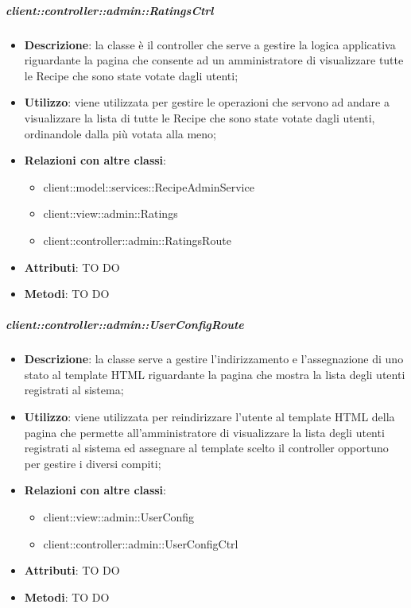 		\subparagraph{client::controller::admin::RatingsCtrl} %
		\label{subp:bdsm_app_client_controller_admin_ratingsctrl}
			\begin{itemize}
				\item \textbf{Descrizione}: la classe è il controller che serve a gestire la logica applicativa riguardante la pagina che consente ad un amministratore di visualizzare tutte le Recipe che sono state votate dagli utenti;
				\item \textbf{Utilizzo}: viene utilizzata per gestire le operazioni che servono ad andare a visualizzare la lista di tutte le Recipe che sono state votate dagli utenti, ordinandole dalla più votata alla meno;
				\item \textbf{Relazioni con altre classi}:
					\begin{itemize}
						\item client::model::services::RecipeAdminService
						\item client::view::admin::Ratings
						\item client::controller::admin::RatingsRoute
					\end{itemize}
				\item \textbf{Attributi}: TO DO
				\item \textbf{Metodi}: TO DO
			\end{itemize}

		\subparagraph{client::controller::admin::UserConfigRoute} %
		\label{subp:bdsm_app_client_controller_admin_userconfigroute}
			\begin{itemize}
				\item \textbf{Descrizione}: la classe serve a gestire l'indirizzamento e l'assegnazione di uno stato al template HTML riguardante la pagina che mostra la lista degli utenti registrati al sistema;
				\item \textbf{Utilizzo}: viene utilizzata per reindirizzare l'utente al template HTML della pagina che permette all'amministratore di visualizzare la lista degli utenti registrati al sistema ed assegnare al template scelto il controller opportuno per gestire i diversi compiti;
				\item \textbf{Relazioni con altre classi}:
					\begin{itemize}
						\item client::view::admin::UserConfig
						\item client::controller::admin::UserConfigCtrl
					\end{itemize}
				\item \textbf{Attributi}: TO DO
				\item \textbf{Metodi}: TO DO
			\end{itemize}

